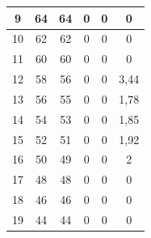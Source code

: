 \begin{table}[]
\begin{tabular}{|c|c|c|c|c|c|}
 			9                                            & 64                     & 64                    & 0                     & 0                      & 0                                                  \\ \hline
 			10                                           & 62                     & 62                    & 0                     & 0                      & 0                                                  \\ \hline
 			11                                           & 60                     & 60                    & 0                     & 0                      & 0                                                  \\ \hline
 			12                                           & 58                     & 56                    & 0                     & 0                      & 3,44                                        \\ \hline
 			13                                           & 56                     & 55                    & 0                     & 0                      & 1,78                                        \\ \hline
 			14                                           & 54                     & 53                    & 0                     & 0                      & 1,85                                       \\ \hline
 			15                                           & 52                     & 51                    & 0                     & 0                      & 1,92                                      \\ \hline
 			16                                           & 50                     & 49                    & 0                     & 0                      & 2                                                  \\ \hline
 			17                                           & 48                     & 48                    & 0                     & 0                      & 0                                                  \\ \hline
 			18                                           & 46                     & 46                    & 0                     & 0                      & 0                                                  \\ \hline
 			19                                           & 44                     & 44                    & 0                     & 0                      & 0                                                  \\ \hline

\end{tabular}
\end{table}
